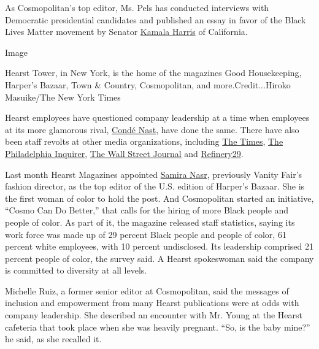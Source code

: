 As Cosmopolitan's top editor, Ms. Pels has conducted interviews with
Democratic presidential candidates and published an essay in favor of
the Black Lives Matter movement by Senator
\href{https://www.cosmopolitan.com/politics/a32766156/kamala-harris-black-lives-matter-protests/}{Kamala
Harris} of California.

Image

Hearst Tower, in New York, is the home of the magazines Good
Housekeeping, Harper's Bazaar, Town \& Country, Cosmopolitan, and
more.Credit...Hiroko Masuike/The New York Times

Hearst employees have questioned company leadership at a time when
employees at its more glamorous rival,
\href{https://www.nytimes3xbfgragh.onion/2020/06/13/business/media/conde-nast-racial.html}{Condé
Nast}, have done the same. There have also been staff revolts at other
media organizations, including
\href{https://www.nytimes3xbfgragh.onion/2020/06/07/business/media/james-bennet-resigns-nytimes-op-ed.html}{The
Times},
\href{https://www.nytimes3xbfgragh.onion/2020/06/06/business/media/editor-philadephia-inquirer-resigns.html}{The
Philadelphia Inquirer},
\href{https://www.nytimes3xbfgragh.onion/2020/07/10/business/media/wall-street-journal-staff.html}{The
Wall Street Journal} and
\href{https://www.nytimes3xbfgragh.onion/2020/06/08/business/media/refinery-29-christene-barberich.html}{Refinery29}.

Last month Hearst Magazines appointed
\href{https://www.nytimes3xbfgragh.onion/2020/06/09/business/media/harpers-bazaar-editor-samira-nasr.html}{Samira
Nasr}, previously Vanity Fair's fashion director, as the top editor of
the U.S. edition of Harper's Bazaar. She is the first woman of color to
hold the post. And Cosmopolitan started an initiative, ``Cosmo Can Do
Better,'' that calls for the hiring of more Black people and people of
color. As part of it, the magazine released staff statistics, saying its
work force was made up of 29 percent Black people and people of color,
61 percent white employees, with 10 percent undisclosed. Its leadership
comprised 21 percent people of color, the survey said. A Hearst
spokeswoman said the company is committed to diversity at all levels.

Michelle Ruiz, a former senior editor at Cosmopolitan, said the messages
of inclusion and empowerment from many Hearst publications were at odds
with company leadership. She described an encounter with Mr. Young at
the Hearst cafeteria that took place when she was heavily pregnant.
``So, is the baby mine?'' he said, as she recalled it.

